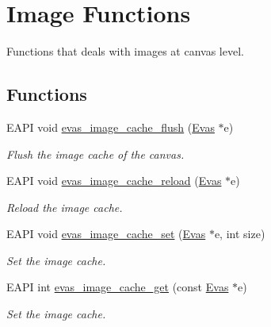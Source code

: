 \section{Image Functions}
\label{group__Evas__Image__Group}


Functions that deals with images at canvas level.  


\subsection*{Functions}
\begin{DoxyCompactItemize}
\item 
EAPI void \hyperlink{group__Evas__Image__Group_gab236c9384f6fc7a3e1563839720a8214}{evas\_\-image\_\-cache\_\-flush} (\hyperlink{group__Evas__Canvas_ga5ff87cc4ce6bc43e3b640a6d37f73043}{Evas} $\ast$e)
\begin{DoxyCompactList}\small\item\em Flush the image cache of the canvas. \item\end{DoxyCompactList}\item 
EAPI void \hyperlink{group__Evas__Image__Group_gaec7f0a6cd5e39ebc6f0a80e945127981}{evas\_\-image\_\-cache\_\-reload} (\hyperlink{group__Evas__Canvas_ga5ff87cc4ce6bc43e3b640a6d37f73043}{Evas} $\ast$e)
\begin{DoxyCompactList}\small\item\em Reload the image cache. \item\end{DoxyCompactList}\item 
EAPI void \hyperlink{group__Evas__Image__Group_gab28271aad78206e5ee9bed62e0decfa7}{evas\_\-image\_\-cache\_\-set} (\hyperlink{group__Evas__Canvas_ga5ff87cc4ce6bc43e3b640a6d37f73043}{Evas} $\ast$e, int size)
\begin{DoxyCompactList}\small\item\em Set the image cache. \item\end{DoxyCompactList}\item 
EAPI int \hyperlink{group__Evas__Image__Group_gad7ee7f4627d198c0de0ff197fe2f9ed0}{evas\_\-image\_\-cache\_\-get} (const \hyperlink{group__Evas__Canvas_ga5ff87cc4ce6bc43e3b640a6d37f73043}{Evas} $\ast$e)
\begin{DoxyCompactList}\small\item\em Set the image cache. \item\end{DoxyCompactList}\end{DoxyCompactItemize}


